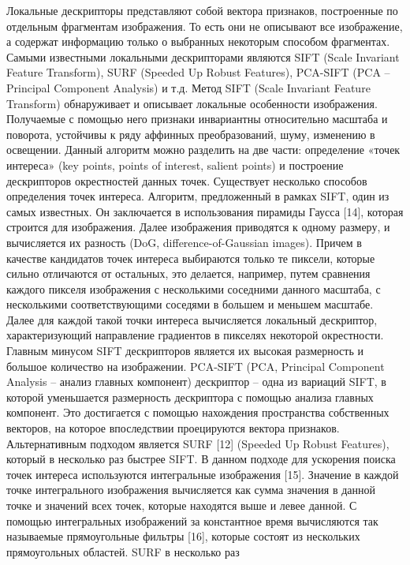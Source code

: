 Локальные дескрипторы представляют собой вектора признаков, построенные по
отдельным фрагментам изображения. То есть они не описывают все изображение, а
содержат информацию только о выбранных некоторым способом фрагментах. Самыми
известными локальными дескрипторами являются SIFT \cite{lowe1999sift} (Scale Invariant Feature
Transform), SURF \cite{bay2006surf} (Speeded Up Robust Features), PCA-SIFT \cite{ke2004pcasift} (PCA – Principal
Component Analysis) и т.д.
Метод SIFT (Scale Invariant Feature Transform) обнаруживает и описывает
локальные особенности изображения. Получаемые с помощью него признаки
инвариантны относительно масштаба и поворота, устойчивы к ряду аффинных
преобразований, шуму, изменению в освещении. Данный алгоритм можно разделить на
две части: определение «точек интереса» (key points, points of interest, salient points) и построение дескрипторов окрестностей данных точек. Существует несколько способов
определения точек интереса. Алгоритм, предложенный в рамках SIFT, один из самых
известных. Он заключается в использования пирамиды Гаусса [14], которая строится для
изображения. Далее изображения приводятся к одному размеру, и вычисляется их
разность (DoG, difference-of-Gaussian images). Причем в
качестве кандидатов точек интереса выбираются только те пиксели, которые сильно
отличаются от остальных, это делается, например, путем сравнения каждого пикселя
изображения с несколькими соседними данного масштаба, с несколькими
соответствующими соседями в большем и меньшем масштабе. 
Далее для каждой такой точки интереса вычисляется локальный дескриптор,
характеризующий направление градиентов в пикселях некоторой окрестности. Главным
минусом SIFT дескрипторов является их высокая размерность и большое количество на
изображении. PCA-SIFT \cite{ke2004pcasift} (PCA, Principal Component Analysis – анализ главных
компонент) дескриптор – одна из вариаций SIFT, в которой уменьшается размерность
дескриптора с помощью анализа главных компонент. Это достигается с помощью
нахождения пространства собственных векторов, на которое впоследствии проецируются
вектора признаков.
Альтернативным подходом является SURF [12] (Speeded Up Robust Features),
который в несколько раз быстрее SIFT. В данном подходе для ускорения поиска точек
интереса используются интегральные изображения [15]. Значение в каждой точке
интегрального изображения вычисляется как сумма значения в данной точке и значений
всех точек, которые находятся выше и левее данной. С помощью интегральных
изображений за константное время вычисляются так называемые прямоугольные фильтры
[16], которые состоят из нескольких прямоугольных областей. SURF в несколько раз
